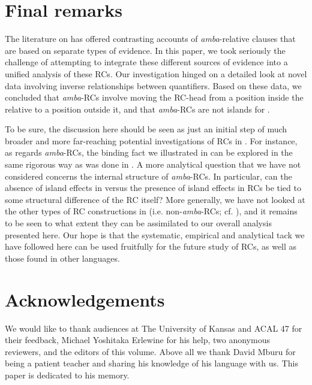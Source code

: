 \documentclass[output=paper
,newtxmath
,modfonts
,nonflat]{langsci/langscibook}
\begin{document}
\section{Final remarks}\label{sec:gould:6}

The literature on  has offered contrasting accounts of \textit{amba}{}-relative clauses that are based on separate types of evidence. In this paper, we took seriously the challenge of attempting to integrate these different sources of evidence into a unified analysis of these RCs. Our investigation hinged on a detailed look at novel data involving inverse  relationships between quantifiers. Based on these data, we concluded that \textit{amba}{}-RCs involve moving the RC-head from a position inside the relative to a position outside it, and that \textit{amba}{}-RCs are not islands for . 

To be sure, the discussion here should be seen as just an initial step of much broader and more far-reaching potential investigations of RCs in . For instance, as regards \textit{amba}{}-RCs, the binding fact we illustrated in  can be explored in the same rigorous way as was done in . A more analytical question that we have not considered concerns the internal structure of \textit{amba}{}-RCs. In particular, can the absence of island effects in  versus the presence of island effects in  RCs be tied to some structural difference of the RC itself? More generally, we have not looked at the other types of RC constructions in  (i.e. non-\textit{amba}{}-RCs; cf. \citealt{Ngonyani2001}), and it remains to be seen to what extent they can be assimilated to our overall analysis presented here. Our hope is that the systematic, empirical and analytical tack we have followed here can be used fruitfully for the future study of  RCs, as well as those found in other languages.

\section*{Acknowledgements}
We would like to thank audiences at The University of Kansas and ACAL 47 for their feedback, Michael Yoshitaka Erlewine for his help, two anonymous reviewers, and the editors of this volume. Above all we thank David Mburu for being a patient teacher and sharing his knowledge of his language with us. This paper is dedicated to his memory.
\end{document}
